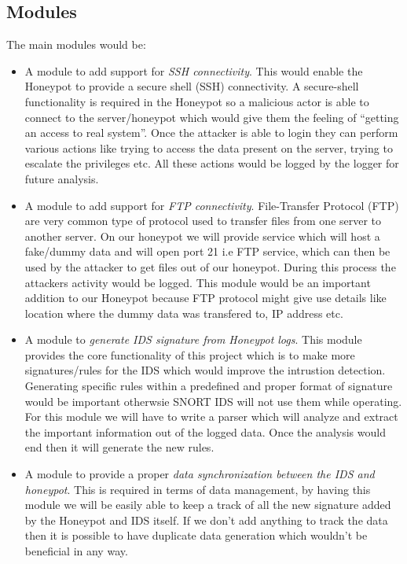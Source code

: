 \documentclass[conference]{IEEEtran}
\begin{document}
\subsection{Modules}

The main modules would be:
\begin{itemize}
    

\item  A module to add support for \textit{SSH connectivity}. This would enable the Honeypot to provide a secure shell (SSH) connectivity. A secure-shell functionality is required in the Honeypot so a malicious actor is able to connect to the server/honeypot which would give them the feeling of ``getting an access to real system''. Once the attacker is able to login they can perform various actions like trying to access the data present on the server, trying to escalate the privileges etc. All these actions would be logged by the logger for future analysis.\\

\item A module to add support for \textit{FTP connectivity}. File-Transfer Protocol (FTP) are very common type of protocol used to transfer files from one server to another server. On our honeypot we will provide service which will host a fake/dummy data and will open port 21 i.e FTP service, which can then be used by the attacker to get files out of our honeypot. During this process the attackers activity would be logged. This module would be an important addition to our Honeypot because FTP protocol might give use details like location where the dummy data was transfered to, IP address etc. \\

\item  A module to \textit{generate IDS signature from Honeypot logs}. This module provides the core functionality of this project which is to make more signatures/rules for the IDS which would improve the intrustion detection. Generating specific rules within a predefined and proper format of signature would be important otherwsie SNORT IDS will not use them while operating. For this module we will have to write a parser which will analyze and extract the important information out of the logged data. Once the analysis would end then it will generate the new rules. \\

\item  A module to provide a proper \textit{data synchronization between the IDS and honeypot}. This is required in terms of data management, by having this module we will be easily able to keep a track of all the new signature added by the Honeypot and IDS itself. If we don't add anything to track the data then it is possible to have duplicate data generation which wouldn't be beneficial in any way. \\

\end{itemize}
\end{document}
